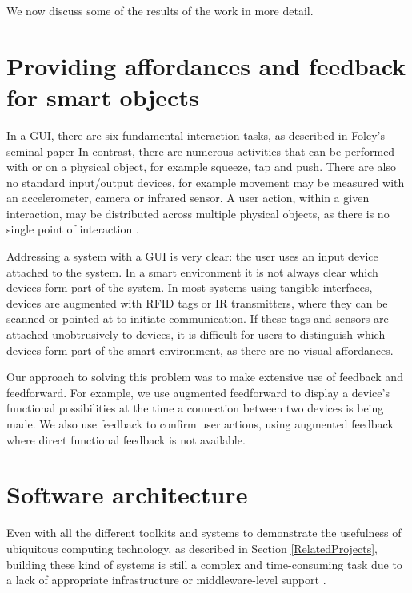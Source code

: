 We now discuss some of the results of the work in more detail.

\section{Providing affordances and feedback for smart objects}

In a \ac{GUI}, there are six fundamental interaction tasks, as described in Foley's seminal paper \cite{Foley1984} In contrast, there are numerous activities that can be performed with or on a physical object, for example squeeze, tap and push. There are also no standard input/output devices, for example movement may be measured with an accelerometer, camera or infrared sensor. A user action, within a given interaction, may be distributed across multiple physical objects, as there is no single point of interaction \cite{Dourish2004}. 

 Addressing a system with a \ac{GUI} is very clear: the user uses an input device attached to the system. In a smart environment it is not always clear which devices form part of the system. In most systems using tangible interfaces, devices are augmented with \ac{RFID} tags or IR transmitters, where they can be scanned or pointed at to initiate communication. If these tags and sensors are attached unobtrusively to devices, it is difficult for users to distinguish which devices form part of the smart environment, as there are no visual affordances. 
	
 Our approach to solving this problem was to make extensive use of feedback and feedforward. For example, we use augmented feedforward to display a device's functional possibilities at the time a connection between two devices is being made. We also use feedback to confirm user actions, using augmented feedback where direct functional feedback is not available.


\section{Software architecture}
\label{swconclude}
Even with all the different toolkits and systems to demonstrate the usefulness of ubiquitous computing technology, as described in Section \ref{RelatedProjects}, building these kind of systems is still a complex and time-consuming task due to a lack of appropriate infrastructure or middle\-ware-level support \cite{Gu2004}.


